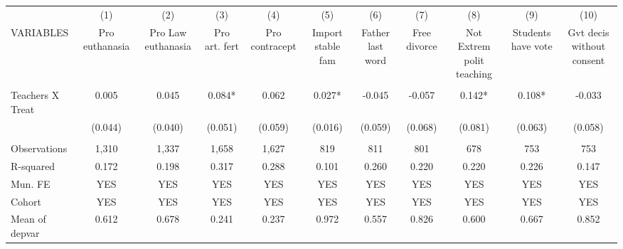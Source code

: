 \begin{tabular}{lcccccccccc} \hline
 & (1) & (2) & (3) & (4) & (5) & (6) & (7) & (8) & (9) & (10) \\
VARIABLES & Pro euthanasia & Pro Law euthanasia & Pro art. fert & Pro contracept & Import stable fam & Father last word & Free divorce & Not Extrem polit teaching & Students have vote & Gvt decis without consent \\ \hline
 &  &  &  &  &  &  &  &  &  &  \\
Teachers X Treat & 0.005 & 0.045 & 0.084* & 0.062 & 0.027* & -0.045 & -0.057 & 0.142* & 0.108* & -0.033 \\
 & (0.044) & (0.040) & (0.051) & (0.059) & (0.016) & (0.059) & (0.068) & (0.081) & (0.063) & (0.058) \\
 &  &  &  &  &  &  &  &  &  &  \\
Observations & 1,310 & 1,337 & 1,658 & 1,627 & 819 & 811 & 801 & 678 & 753 & 753 \\
R-squared & 0.172 & 0.198 & 0.317 & 0.288 & 0.101 & 0.260 & 0.220 & 0.220 & 0.226 & 0.147 \\
Mun. FE & YES & YES & YES & YES & YES & YES & YES & YES & YES & YES \\
Cohort & YES & YES & YES & YES & YES & YES & YES & YES & YES & YES \\
 Mean of depvar & 0.612 & 0.678 & 0.241 & 0.237 & 0.972 & 0.557 & 0.826 & 0.600 & 0.667 & 0.852 \\ \hline
\end{tabular}
